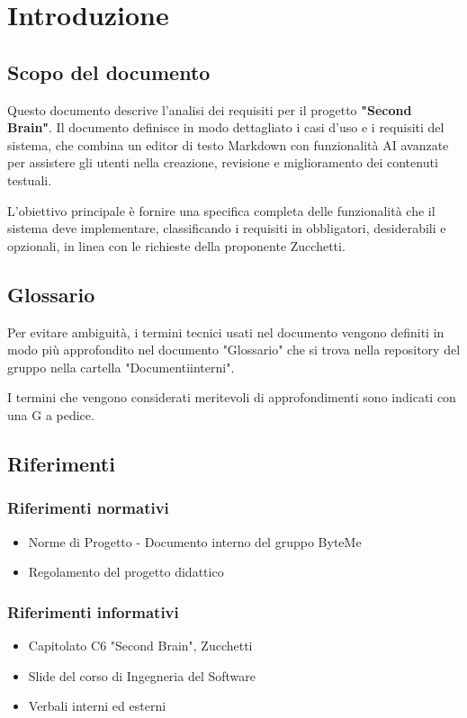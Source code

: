 \documentclass[11pt,a4paper]{article}
\begin{document}
\tableofcontents
\thispagestyle{empty}
\newpage

\setcounter{page}{1}

\section{Introduzione}
\subsection{Scopo del documento}
Questo documento descrive l'analisi dei requisiti per il progetto \textbf{"Second Brain"}. Il documento definisce in modo dettagliato i casi d'uso e i requisiti del sistema, che combina un editor di testo Markdown con funzionalità AI avanzate per assistere gli utenti nella creazione, revisione e miglioramento dei contenuti testuali.

L'obiettivo principale è fornire una specifica completa delle funzionalità che il sistema deve implementare, classificando i requisiti in obbligatori, desiderabili e opzionali, in linea con le richieste della proponente Zucchetti.

\subsection{Glossario}
Per evitare ambiguità, i termini tecnici usati nel documento vengono definiti in modo più approfondito nel documento "Glossario" che si trova nella repository del gruppo nella cartella "Documenti\textunderscore interni".

I termini che vengono considerati meritevoli di approfondimenti sono indicati con una G a pedice.

\subsection{Riferimenti}
\subsubsection{Riferimenti normativi}
\begin{itemize}
    \item Norme di Progetto - Documento interno del gruppo ByteMe
    \item Regolamento del progetto didattico
\end{itemize}

\subsubsection{Riferimenti informativi}
\begin{itemize}
    \item Capitolato C6 "Second Brain", Zucchetti
    \item Slide del corso di Ingegneria del Software
    \item Verbali interni ed esterni
\end{itemize}
\end{document}
